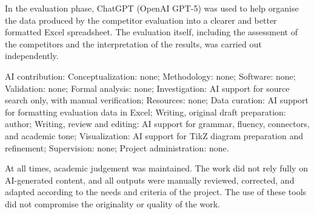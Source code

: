 In the evaluation phase, ChatGPT (OpenAI GPT-5) was used to help organise the data produced by the competitor evaluation into a clearer and better formatted Excel spreadsheet. The evaluation itself, including the assessment of the competitors and the interpretation of the results, was carried out independently.

AI contribution: Conceptualization: none; Methodology: none; Software: none; Validation: none; Formal analysis: none; Investigation: AI support for source search only, with manual verification; Resources: none; Data curation: AI support for formatting evaluation data in Excel; Writing, original draft preparation: author; Writing, review and editing: AI support for grammar, fluency, connectors, and academic tone; Visualization: AI support for TikZ diagram preparation and refinement; Supervision: none; Project administration: none.

At all times, academic judgement was maintained. The work did not rely fully on AI-generated content, and all outputs were manually reviewed, corrected, and adapted according to the needs and criteria of the project. The use of these tools did not compromise the originality or quality of the work.
